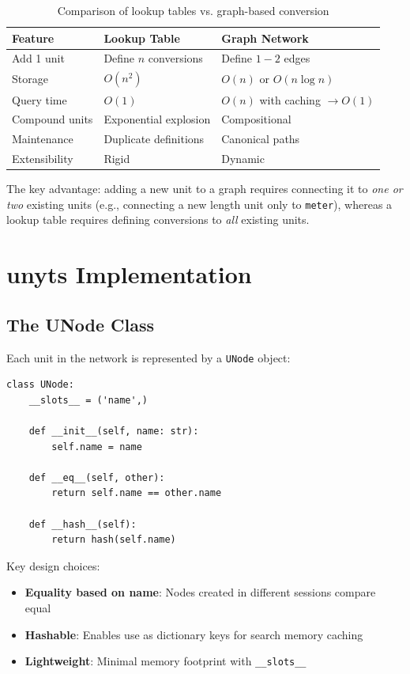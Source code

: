 \documentclass[11pt,a4paper]{report}
\begin{document}
\begin{table}[h]
\centering
\begin{tabular}{@{}lll@{}}
\toprule
\textbf{Feature} & \textbf{Lookup Table} & \textbf{Graph Network} \\
\midrule
Add 1 unit & Define $n$ conversions & Define $1{-}2$ edges \\
Storage & $O(n^2)$ & $O(n)$ or $O(n \log n)$ \\
Query time & $O(1)$ & $O(n)$ with caching $\rightarrow O(1)$ \\
Compound units & Exponential explosion & Compositional \\
Maintenance & Duplicate definitions & Canonical paths \\
Extensibility & Rigid & Dynamic \\
\bottomrule
\end{tabular}
\caption{Comparison of lookup tables vs. graph-based conversion}
\label{tab:graph_vs_lookup}
\end{table}

The key advantage: adding a new unit to a graph requires connecting it to \emph{one or two} existing units (e.g., connecting a new length unit only to \texttt{meter}), whereas a lookup table requires defining conversions to \emph{all} existing units.

\section{unyts Implementation}

\subsection{The UNode Class}

Each unit in the network is represented by a \texttt{UNode} object:

\begin{lstlisting}[style=pythonstyle, caption={UNode implementation (simplified)}]
class UNode:
    __slots__ = ('name',)
    
    def __init__(self, name: str):
        self.name = name
    
    def __eq__(self, other):
        return self.name == other.name
    
    def __hash__(self):
        return hash(self.name)
\end{lstlisting}

Key design choices:
\begin{itemize}[leftmargin=*]
  \item \textbf{Equality based on name}: Nodes created in different sessions compare equal
  \item \textbf{Hashable}: Enables use as dictionary keys for search memory caching
  \item \textbf{Lightweight}: Minimal memory footprint with \texttt{\_\_slots\_\_}
\end{itemize}
\end{document}

